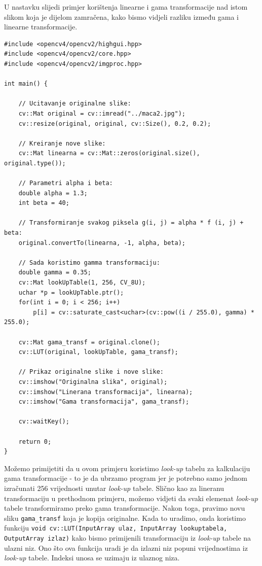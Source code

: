 \documentclass[a4paper, 12pt]{article}
\begin{document}
U nastavku slijedi primjer korištenja linearne i gama transformacije nad istom slikom koja je dijelom zamračena, kako bismo vidjeli razliku između gama i linearne transformacije.

\begin{lstlisting}
#include <opencv4/opencv2/highgui.hpp>
#include <opencv4/opencv2/core.hpp>
#include <opencv4/opencv2/imgproc.hpp>

int main() {

    // Ucitavanje originalne slike:
    cv::Mat original = cv::imread("../maca2.jpg");
    cv::resize(original, original, cv::Size(), 0.2, 0.2);

    // Kreiranje nove slike:
    cv::Mat linearna = cv::Mat::zeros(original.size(), original.type());

    // Parametri alpha i beta:
    double alpha = 1.3;
    int beta = 40;

    // Transformiranje svakog piksela g(i, j) = alpha * f (i, j) + beta:
    original.convertTo(linearna, -1, alpha, beta);

    // Sada koristimo gamma transformaciju:
    double gamma = 0.35;
    cv::Mat lookUpTable(1, 256, CV_8U);
    uchar *p = lookUpTable.ptr();
    for(int i = 0; i < 256; i++)
        p[i] = cv::saturate_cast<uchar>(cv::pow((i / 255.0), gamma) * 255.0);

    cv::Mat gama_transf = original.clone();
    cv::LUT(original, lookUpTable, gama_transf);

    // Prikaz originalne slike i nove slike:
    cv::imshow("Originalna slika", original);
    cv::imshow("Linerana transformacija", linearna);
    cv::imshow("Gama transformacija", gama_transf);

    cv::waitKey();

    return 0;
}
\end{lstlisting}

Možemo primijetiti da u ovom primjeru koristimo \textit{look-up} tabelu za kalkulaciju gama transformacije - to je da ubrzamo program jer je potrebno samo jednom izračunati 256 vrijednosti unutar \textit{look-up} tabele. Slično kao za lineranu transformaciju u prethodnom primjeru, možemo vidjeti da svaki elemenat \textit{look-up} tabele transformiramo preko gama transformacije. Nakon toga, pravimo novu sliku \lstinline{gama_transf} koja je kopija originalne. Kada to uradimo, onda koristimo funkciju \lstinline{void cv::LUT(InputArray ulaz, InputArray lookuptabela, OutputArray izlaz)} kako bismo primijenili transformaciju iz \textit{look-up} tabele na ulazni niz. Ono što ova funkcija uradi je da izlazni niz popuni vrijednostima iz \textit{look-up} tabele. Indeksi unosa se uzimaju iz ulaznog niza. 
\end{document}
